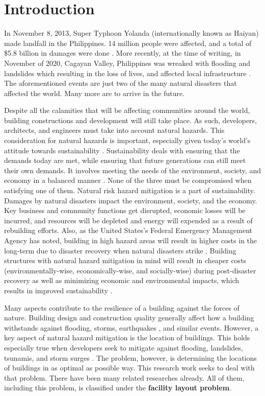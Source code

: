 \chapter{Introduction} \label{sec:intro}

In November 8, 2013, Super Typhoon Yolanda (internationally known as Haiyan) made landfall in the Philippines. 14 million people were affected, and a total of \$5.8 billion in damages were done \cite{Reid}. More recently, at the time of writing, in November of 2020, Cagayan Valley, Philippines was wreaked with flooding and landslides which resulting in the loss of lives, and affected local infrastructure \cite{CagayanFloodingNews}. The aforementioned events are just two of the many natural disasters that affected the world. Many more are to arrive in the future.

Despite all the calamities that will be affecting communities around the world, building constructions and development will still take place. As such, developers, architects, and engineers must take into account natural hazards. This consideration for natural hazards is important, especially given today's world's attitude towards sustainability \cite{Padgett2013}. Sustainability deals with ensuring that the demands today are met, while ensuring that future generations can still meet their own demands. It involves meeting the needs of the environment, society, and economy in a balanced manner \cite{Dimian2014}. None of the three must be compromised when satisfying one of them. Natural risk hazard mitigation is a part of sustainability. Damages by natural disasters impact the environment, society, and the economy. Key business and community functions get disrupted, economic losses will be incurred, and resources will be depleted and energy will expended as a result of rebuilding efforts. Also, as the United States's Federal Emergency Management Agency has noted, building in high hazard areas will result in higher costs in the long-term due to disaster recovery when natural disasters strike \cite{UnitedStatesFederalEmergencyManagementAgency2000}. Building structures with natural hazard mitigation in mind will result in cheaper costs (environmentally-wise, economically-wise, and socially-wise) during post-disaster recovery as well as minimizing economic and environmental impacts, which results in improved sustainability \cite{Padgett2013}.

Many aspects contribute to the resilience of a building against the forces of nature. Building design and construction quality generally affect how a building withstands against flooding, storms, earthquakes \cite{Lewis2012}, and similar events. However, a key aspect of natural hazard mitigation is the location of buildings. This holds especially true when developers seek to mitigate against flooding, landslides, tsunamis, and storm surges \cite{WBDGSecure/SafeCommittee}. The problem, however, is determining the locations of buildings in as optimal as possible way. This research work seeks to deal with that problem. There have been many related researches already. All of them, including this problem, is classified under the \textbf{facility layout problem}.

